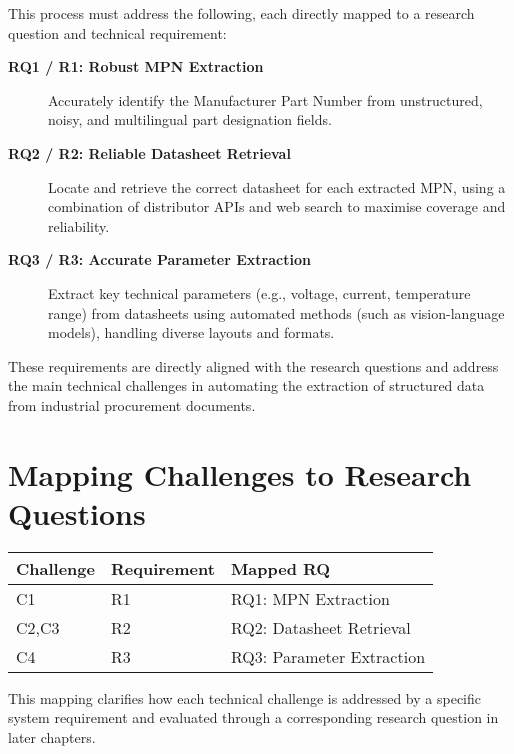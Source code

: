 This process must address the following, each directly mapped to a research question and technical requirement:

\begin{description}
  \item[\textbf{RQ1 / R1: Robust MPN Extraction}] Accurately identify the Manufacturer Part Number from unstructured, noisy, and multilingual part designation fields.
  \item[\textbf{RQ2 / R2: Reliable Datasheet Retrieval}] Locate and retrieve the correct datasheet for each extracted MPN, using a combination of distributor APIs and web search to maximise coverage and reliability.
  \item[\textbf{RQ3 / R3: Accurate Parameter Extraction}] Extract key technical parameters (e.g., voltage, current, temperature range) from datasheets using automated methods (such as vision-language models), handling diverse layouts and formats.
\end{description}

These requirements are directly aligned with the research questions and address the main technical challenges in automating the extraction of structured data from industrial procurement documents.



\section{Mapping Challenges to Research Questions}
\begin{center}
\begin{tabular}{lll}
\textbf{Challenge} & \textbf{Requirement} & \textbf{Mapped RQ} \\\hline
C1 & R1 & RQ1: MPN Extraction \\
C2,C3 & R2 & RQ2: Datasheet Retrieval \\
C4 & R3 & RQ3: Parameter Extraction \\
\end{tabular}
\end{center}

This mapping clarifies how each technical challenge is addressed by a specific system requirement and evaluated through a corresponding research question in later chapters.
